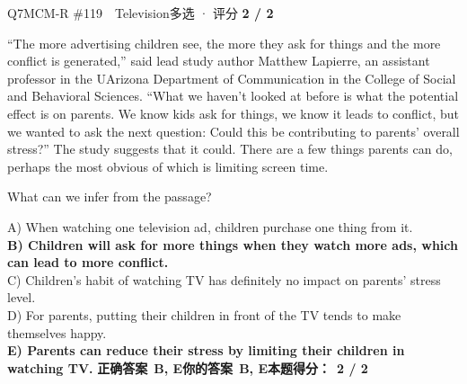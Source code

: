 \begin{qblock}{Q7\quad MCM-R \#119\ \ Television}{多选 · 评分 \textcolor{cAccent}{\bfseries 2 / 2}}
\begin{promptbox}
``The more advertising children see, the more they ask for things and the more conflict is generated,'' said lead study author Matthew Lapierre, an assistant professor in the UArizona Department of Communication in the College of Social and Behavioral Sciences. ``What we haven't looked at before is what the potential effect is on parents. We know kids ask for things, we know it leads to conflict, but we wanted to ask the next question: Could this be contributing to parents' overall stress?'' The study suggests that it could. There are a few things parents can do, perhaps the most obvious of which is limiting screen time.
\end{promptbox}
\begin{notebox}What can we infer from the passage?\end{notebox}
{\small
A) When watching one television ad, children purchase one thing from it.\\
{\color{cFix}\textbf{B) Children will ask for more things when they watch more ads, which can lead to more conflict.}}\\
C) Children's habit of watching TV has definitely no impact on parents' stress level.\\
D) For parents, putting their children in front of the TV tends to make themselves happy.\\
{\color{cFix}\textbf{E) Parents can reduce their stress by limiting their children in watching TV.}}}
\smallskip
\textbf{正确答案}\ \textcolor{cFix}{\bfseries B, E}\qquad\textbf{你的答案}\ \textcolor{cFix}{\bfseries B, E}\qquad\textbf{本题得分：}\ {\color{cAccent}\bfseries 2 / 2}
\end{qblock}

